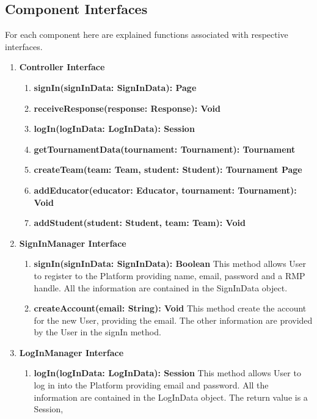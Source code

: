\subsection{Component Interfaces}
For each component here are explained functions associated with respective interfaces.
\begin{enumerate}
    \item \textbf{Controller Interface}
            \begin{enumerate}[label=$\bullet$]
                \item \textbf{signIn(signInData: SignInData): Page}
                \item \textbf{receiveResponse(response: Response): Void}
                \item \textbf{logIn(logInData: LogInData): Session}
                \item \textbf{getTournamentData(tournament: Tournament): Tournament}
                \item \textbf{createTeam(team: Team, student: Student): Tournament Page}
                \item \textbf{addEducator(educator: Educator, tournament: Tournament): Void}
                \item \textbf{addStudent(student: Student, team: Team): Void}
            \end{enumerate}
    \item \textbf{SignInManager Interface} 
            \begin{enumerate}[label=$\bullet$]
                \item \textbf{signIn(signInData: SignInData): Boolean} This method allows User to register to the Platform providing name, email, password and a RMP handle. All the information are contained in the SignInData object.
                \item \textbf{createAccount(email: String): Void} This method create the account for the new User, providing the email. The other information are provided by the User in the signIn method.
            \end{enumerate}
    \item \textbf{LogInManager Interface}
        \begin{enumerate}[label=$\bullet$]
            \item \textbf{logIn(logInData: LogInData): Session} This method allows User to log in into the Platform providing email and password. All the information are contained in the LogInData object. The return value is a Session,

\end{enumerate}
\end{enumerate}
